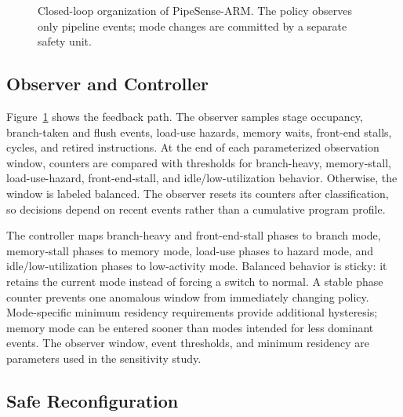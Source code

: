 \documentclass[conference]{IEEEtran}
\newcommand{\pipesense}{PipeSense-ARM}
\begin{document}
\begin{figure}[t]
\centering
{}
\caption{Closed-loop organization of \pipesense{}. The policy observes only
pipeline events; mode changes are committed by a separate safety unit.}
\label{fig:architecture}
\end{figure}

\subsection{Observer and Controller}

Figure~\ref{fig:architecture} shows the feedback path. The observer samples
stage occupancy, branch-taken and flush events, load-use hazards, memory waits,
front-end stalls, cycles, and retired instructions. At the end of each
parameterized observation window, counters are compared with thresholds for
branch-heavy, memory-stall, load-use-hazard, front-end-stall, and
idle/low-utilization behavior. Otherwise, the window is labeled balanced. The
observer resets its counters after classification, so decisions depend on
recent events rather than a cumulative program profile.

The controller maps branch-heavy and front-end-stall phases to branch mode,
memory-stall phases to memory mode, load-use phases to hazard mode, and
idle/low-utilization phases to low-activity mode. Balanced behavior is sticky:
it retains the current mode instead of forcing a switch to normal. A stable
phase counter prevents one anomalous window from immediately changing policy.
Mode-specific minimum residency requirements provide additional hysteresis;
memory mode can be entered sooner than modes intended for less dominant events.
The observer window, event thresholds, and minimum residency are parameters
used in the sensitivity study.

\subsection{Safe Reconfiguration}
\end{document}
